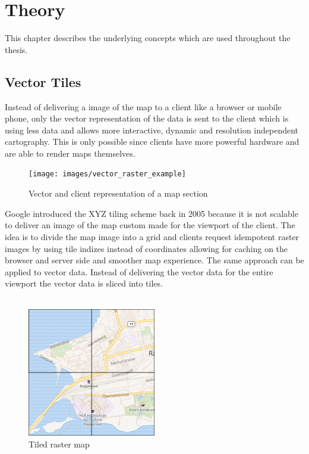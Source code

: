\chapter{Theory}

This chapter describes the underlying concepts which are used throughout the thesis. 

\section{Vector Tiles}\label{part1_vector_tiles}

Instead of delivering a image of the map to a client like a browser or mobile phone, only the vector representation of the data is sent to the client which is using less data and allows more interactive, dynamic  and resolution independent cartography. This is only possible since clients have more powerful hardware and are able to render maps themselves.

\begin{figure}[H]
\centering
\texttt{[image: images/vector\_raster\_example]}
\caption{Vector and client representation of a map section}
\end{figure}

Google introduced the XYZ tiling scheme \cite{v_1_wiki.openstreetmap.org_2015} back in 2005 because it is not scalable to deliver an image of the map custom made for the viewport of the client.
The idea is to divide the map image into a grid and clients request idempotent raster images by using tile indizes instead of coordinates allowing for caching on the browser and server side and smoother map experience.
The same approach can be applied to vector data. Instead of delivering the vector data for the entire viewport the vector data is sliced into tiles. \\\\

\begin{figure}[H]
\centering
\includegraphics[width=0.5\textwidth]{images/tiled_raster}
\caption{Tiled raster map}
\end{figure}

